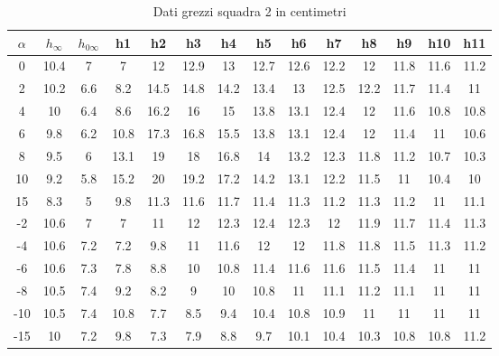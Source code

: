 \begin{table}[h]
\centering
\begin{tabular}{|c|c|c|c|c|c|c|c|c|c|c|c|c|c|}
\hline
$\alpha$ & $h_\infty$ & $h_{0\infty}$ & h1   & h2   & h3   & h4   & h5   & h6   & h7   & h8   & h9   & h10  & h11  \\ \hline
0        & 10.4       & 7             & 7    & 12   & 12.9 & 13   & 12.7 & 12.6 & 12.2 & 12   & 11.8 & 11.6 & 11.2 \\ \hline
2        & 10.2       & 6.6           & 8.2  & 14.5 & 14.8 & 14.2 & 13.4 & 13   & 12.5 & 12.2 & 11.7 & 11.4 & 11   \\ \hline
4        & 10         & 6.4           & 8.6  & 16.2 & 16   & 15   & 13.8 & 13.1 & 12.4 & 12   & 11.6 & 10.8 & 10.8 \\ \hline
6        & 9.8        & 6.2           & 10.8 & 17.3 & 16.8 & 15.5 & 13.8 & 13.1 & 12.4 & 12   & 11.4 & 11   & 10.6 \\ \hline
8        & 9.5        & 6             & 13.1 & 19   & 18   & 16.8 & 14   & 13.2 & 12.3 & 11.8 & 11.2 & 10.7 & 10.3 \\ \hline
10       & 9.2        & 5.8           & 15.2 & 20   & 19.2 & 17.2 & 14.2 & 13.1 & 12.2 & 11.5 & 11   & 10.4 & 10   \\ \hline
15       & 8.3        & 5             & 9.8  & 11.3 & 11.6 & 11.7 & 11.4 & 11.3 & 11.2 & 11.3 & 11.2 & 11   & 11.1 \\ \hline
-2       & 10.6       & 7             & 7    & 11   & 12   & 12.3 & 12.4 & 12.3 & 12   & 11.9 & 11.7 & 11.4 & 11.3 \\ \hline
-4       & 10.6       & 7.2           & 7.2  & 9.8  & 11   & 11.6 & 12   & 12   & 11.8 & 11.8 & 11.5 & 11.3 & 11.2 \\ \hline
-6       & 10.6       & 7.3           & 7.8  & 8.8  & 10   & 10.8 & 11.4 & 11.6 & 11.6 & 11.5 & 11.4 & 11   & 11   \\ \hline
-8       & 10.5       & 7.4           & 9.2  & 8.2  & 9    & 10   & 10.8 & 11   & 11.1 & 11.2 & 11.1 & 11   & 11   \\ \hline
-10      & 10.5       & 7.4           & 10.8 & 7.7  & 8.5  & 9.4  & 10.4 & 10.8 & 10.9 & 11   & 11   & 11   & 11   \\ \hline
-15      & 10         & 7.2           & 9.8  & 7.3  & 7.9  & 8.8  & 9.7  & 10.1 & 10.4 & 10.3 & 10.8 & 10.8 & 11.2 \\ \hline
\end{tabular}
\caption{Dati grezzi squadra 2 in centimetri}
\end{table}

